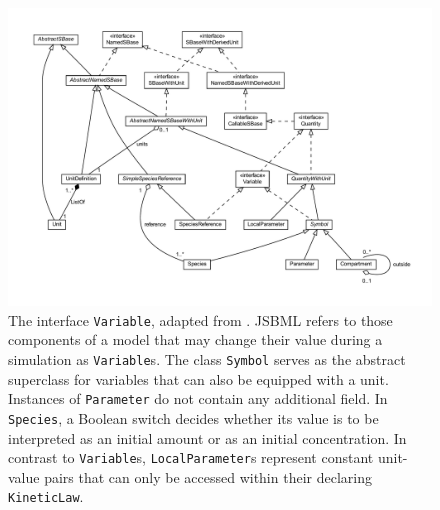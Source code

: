 \documentclass[
  BCOR12mm,
  letterpaper,
  11pt,
  headsepline,
  pointlessnumbers,
  tablecaptionabove,
  onelinecaption,
  headinclude,
  appendixprefix,
  idxtotoc,
  bibtotoc,
  twoside,
  titlepage
]{scrartcl}
\begin{document}
\begin{figure}[p]
 \centering
 \includegraphics[width=\textwidth]{img/Symbol}
 \caption[The interface \texttt{Variable}]{The interface \texttt{Variable}, adapted from \citep{Draeger2011}. JSBML refers to those components of a model that may change their value during a simulation as \texttt{Variable}s. The class \texttt{Symbol} serves as the abstract superclass for variables that can also be equipped with a unit. Instances of \texttt{Parameter} do not contain any additional field. In \texttt{Species}, a Boolean switch decides whether its value is to be interpreted as an initial amount or as an initial concentration. In contrast to \texttt{Variable}s, \texttt{LocalParameter}s represent constant unit-value pairs that can only be accessed within their declaring \texttt{KineticLaw}.}
 \label{fig:Variable}
\end{figure}
\end{document}
